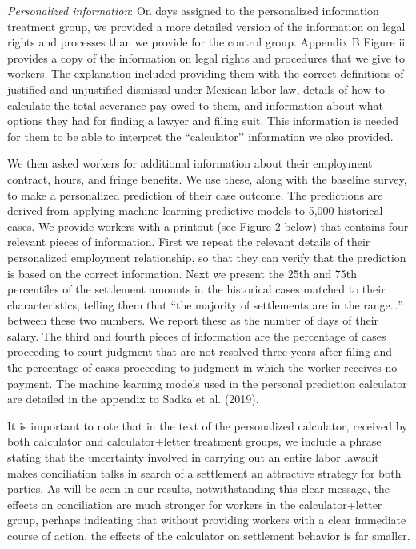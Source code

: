 \documentclass[oneside,12pt]{article}
\begin{document}
\emph{Personalized information}: On days assigned to the personalized information treatment group, we provided a more detailed version of the information on legal rights and processes than we provide for the control group. Appendix B Figure ii provides a copy of the information on legal rights and procedures that we give to workers. The explanation included providing them with the correct definitions of justified and unjustified dismissal under Mexican labor law, details of how to calculate the total severance pay owed to them, and information about what options they had for finding a lawyer and filing suit. This information is needed for them to be able to interpret the ``calculator’’ information we also provided.

We then asked workers for additional information about their employment contract, hours, and fringe benefits. We use these, along with the baseline survey, to make a personalized prediction of their case outcome. The predictions are derived from applying machine learning predictive models to 5,000 historical cases. We provide workers with a printout (see Figure 2 below) that contains four relevant pieces of information. First we repeat the relevant details of their personalized employment relationship, so that they can verify that the prediction is based on the correct information. Next we present the 25th and 75th percentiles of the settlement amounts in the historical cases matched to their characteristics, telling them that “the majority of settlements are in the range…” between these two numbers. We report these as the number of days of their salary. The third and fourth pieces of information are the percentage of cases proceeding to court judgment that are not resolved three years after filing and the percentage of cases proceeding to judgment in which the worker receives no payment. The machine learning models used in the personal prediction calculator are detailed in the appendix to Sadka et al. (2019). 

It is important to note that in the text of the personalized calculator, received by both calculator and calculator+letter treatment groups, we include a phrase stating that the uncertainty involved in carrying out an entire labor lawsuit makes conciliation talks in search of a settlement an attractive strategy for both parties. As will be seen in our results, notwithstanding this clear message, the effects on conciliation are much stronger for workers in the calculator+letter group, perhaps indicating that without providing workers with a clear immediate course of action, the effects of the calculator on settlement behavior is far smaller.
\end{document}
